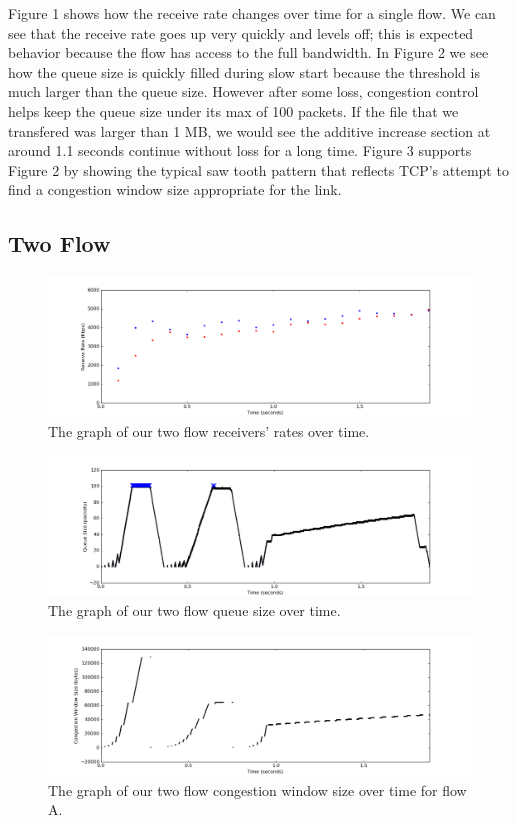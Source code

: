 \documentclass[11pt]{article}
\begin{document}
Figure 1 shows how the receive rate changes over time for a single flow. We can see that the receive rate goes up very quickly and levels off; this is expected behavior because the flow has access to the full bandwidth. In Figure 2 we see how the queue size is quickly filled during slow start because the threshold is much larger than the queue size. However after some loss, congestion control helps keep the queue size under its max of 100 packets. If the file that we transfered was larger than 1 MB, we would see the additive increase section at around 1.1 seconds continue without loss for a long time. Figure 3 supports Figure 2 by showing the typical saw tooth pattern that reflects TCP's attempt to find a congestion window size appropriate for the link. 

\subsection{Two Flow}

\begin{figure}[H]
\caption{The graph of our two flow receivers' rates over time.}
  \label{figure5}
    \centering
    \includegraphics[width=\linewidth]{2f_rate.png}
\end{figure}

\begin{figure}[H]
\caption{The graph of our two flow queue size over time.}
  \label{figure6}
    \centering
    \includegraphics[width=\linewidth]{2f_queue.png}
\end{figure}

\begin{figure}[H]
\caption{The graph of our two flow congestion window size over time for flow A.}
  \label{figure7}
    \centering
    \includegraphics[width=\linewidth]{2f1_window.png}
\end{figure}
\end{document}
